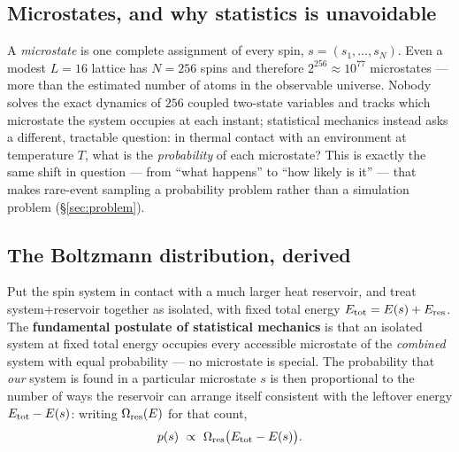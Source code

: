 \documentclass[11pt,a4paper]{article}
\begin{document}
\subsection{Microstates, and why statistics is unavoidable}
A \emph{microstate} is one complete assignment of every spin, $s=(s_1,\dots,s_N)$. Even a modest
$L=16$ lattice has $N=256$ spins and therefore $2^{256}\approx10^{77}$ microstates --- more than
the estimated number of atoms in the observable universe. Nobody solves the exact dynamics of
$256$ coupled two-state variables and tracks which microstate the system occupies at each
instant; statistical mechanics instead asks a different, tractable question: in thermal contact
with an environment at temperature $T$, what is the \emph{probability} of each microstate? This
is exactly the same shift in question --- from ``what happens'' to ``how likely is it'' --- that
makes rare-event sampling a probability problem rather than a simulation problem
(\S\ref{sec:problem}).

\subsection{The Boltzmann distribution, derived}\label{sec:boltzmann}
Put the spin system in contact with a much larger heat reservoir, and treat system$+$reservoir
together as isolated, with fixed total energy $E_{\rm tot}=E(s)+E_{\rm res}$. The
\textbf{fundamental postulate of statistical mechanics} is that an isolated system at fixed total
energy occupies every accessible microstate of the \emph{combined} system with equal probability
--- no microstate is special. The probability that \emph{our} system is found in a particular
microstate $s$ is then proportional to the number of ways the reservoir can arrange itself
consistent with the leftover energy $E_{\rm tot}-E(s)$: writing $\Omega_{\rm res}(E)$ for that
count,
\begin{equation}
p(s)\ \propto\ \Omega_{\rm res}\big(E_{\rm tot}-E(s)\big).
\end{equation}
\end{document}
